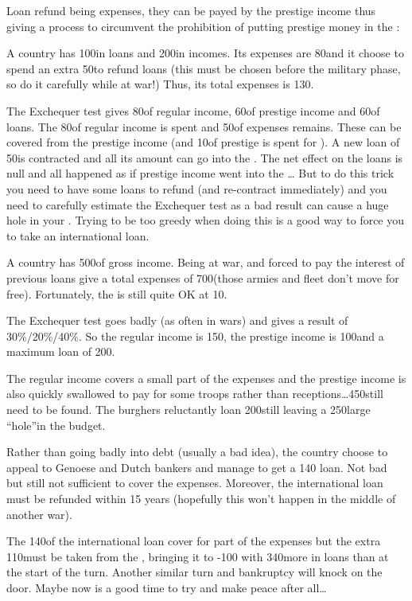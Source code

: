 \begin{exemple}
  Loan refund being expenses, they can be payed by the prestige income thus
  giving a process to circumvent the prohibition of putting prestige money in
  the \RT:\par
  A country has 100\Ducats in loans and 200\Ducats in incomes. Its expenses
  are 80\Ducats and it choose to spend an extra 50\Ducats to refund loans
  (this must be chosen before the military phase, so do it carefully while at
  war!) Thus, its total expenses is 130\Ducats.

  The Exchequer test gives 80\Ducats of regular income, 60\Ducats of prestige
  income and 60\Ducats of loans. The 80\Ducats of regular income is spent and
  50\Ducats of expenses remains. These can be covered from the prestige income
  (and 10\Ducats of prestige is spent for \VPs). A new loan of 50\Ducats is
  contracted and all its amount can go into the \RT. The net effect on the
  loans is null and all happened as if prestige income went into the \RT\ldots
  But to do this trick you need to have some loans to refund (and re-contract
  immediately) and you need to carefully estimate the Exchequer test as a bad
  result can cause a huge hole in your \RT. Trying to be too greedy when doing
  this is a good way to force you to take an international loan.
\end{exemple}

\begin{exemple}
  A country has 500\Ducats of gross income. Being at war, and forced to pay
  the interest of previous loans give a total expenses of 700\Ducats (those
  armies and fleet don't move for free). Fortunately, the \RT is still quite
  OK at 10\Ducats.

  The Exchequer test goes badly (as often in wars) and gives a result of
  30\%/20\%/40\%. So the regular income is 150\Ducats, the prestige income is
  100\Ducats and a maximum loan of 200\Ducats.

  The regular income covers a small part of the expenses and the prestige
  income is also quickly swallowed to pay for some troops rather than
  receptions\ldots 450\Ducats still need to be found. The burghers reluctantly
  loan 200\Ducats still leaving a 250\Ducats large ``hole''in the budget.

  Rather than going badly into debt (usually a bad idea), the country choose
  to appeal to Genoese and Dutch bankers and manage to get a 140\Ducats
  loan. Not bad but still not sufficient to cover the expenses. Moreover, the
  international loan must be refunded within 15 years (hopefully this won't
  happen in the middle of another war).

  The 140\Ducats of the international loan cover for part of the expenses but
  the extra 110\Ducats must be taken from the \RT, bringing it to -100\Ducats
  with 340\Ducats more in loans than at the start of the turn. Another similar
  turn and bankruptcy will knock on the door. Maybe now is a good time to try
  and make peace after all\ldots
\end{exemple}




